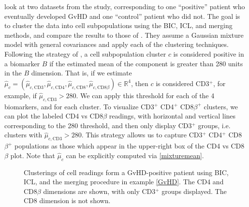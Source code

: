 \documentclass{uwstat572}
\newcommand*\reals{\mathbb{R}}
\newcommand*\estim[1]{\widehat{#1}}
\renewcommand\;{\,}
\begin{document}
\cite{Baudry10} look at two datasets from the study, corresponding to one ``positive'' patient who eventually developed GvHD and one ``control'' patient who did not.
The goal is to cluster the data into cell subpopulations using the BIC, ICL, and merging methods, and compare the results to those of \cite{Brinkman07}.
They assume a Gaussian mixture model with general covariances and apply each of the clustering techniques.
Following the strategy of \cite{Lo08}, a cell subpopulation cluster $c$ is considered positive in a biomarker $B$ if the estimated mean of the component is greater than 280 units in the $B$ dimension.
That is, if we estimate $\estim\mu_c = \left(\estim \mu_{c, \text{CD3}}, \estim \mu_{c, \text{CD4}}, \estim\mu_{c, \text{CD8}}, \estim\mu_{c, \text{CD8$\beta$}}\right) \in \reals^4$, then $c$ is considered CD3$^+$, for example, if $\estim\mu_{c, \text{CD3}} > 280$.
We can apply this threshold for each of the 4 biomarkers, and for each cluster.
To visualize CD3$^+$ CD4$^+$ CD8$\beta^+$ clusters, we can plot the labeled CD4 vs CD8$\beta$ readings, with horizontal and vertical lines corresponding to the 280 threshold, and then only display CD3$^+$ groups, i.e. clusters with $\estim\mu_{c, \text{CD3}} > 280$.
This strategy allows us to capture CD3$^+$ CD4$^+$ CD8$\beta^+$ populations as those which appear in the upper-right box of the CD4 vs CD8$\beta$ plot.
Note that $\estim\mu_c$ can be explicitly computed via \eqref{mixturemean}.

\begin{figure}
\begin{center}
\end{center}
\caption{Clusterings of cell readings form a GvHD-positive patient using BIC, ICL, and the merging procedure in example \ref{GvHD}. The CD4 and CD8$\beta$ dimensions are shown, with only CD3$^+$ groups displayed. The CD8 dimension is not shown.}
\label{positive}
\end{figure}
\end{document}
